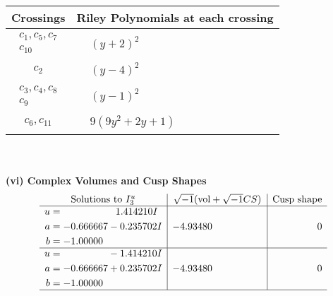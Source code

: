 \documentclass[1p]{elsarticle_modified}
\theoremstyle{definition}
\newcommand{\I}{\sqrt{-1}}
\begin{document}
\begin{tabular}{m{50pt}|m{274pt}}
Crossings & \hspace{64pt}Riley Polynomials at each crossing \\
\hline $$\begin{aligned}c_{1},c_{5},c_{7}\\c_{10}\end{aligned}$$&$\begin{aligned}
&(y+2)^2
\end{aligned}$\\
\hline $$\begin{aligned}c_{2}\end{aligned}$$&$\begin{aligned}
&(y-4)^2
\end{aligned}$\\
\hline $$\begin{aligned}c_{3},c_{4},c_{8}\\c_{9}\end{aligned}$$&$\begin{aligned}
&(y-1)^2
\end{aligned}$\\
\hline $$\begin{aligned}c_{6},c_{11}\end{aligned}$$&$\begin{aligned}
&9(9 y^2+2 y+1)
\end{aligned}$\\
\hline
\end{tabular}\\~\\
\newpage\flushleft \textbf{(vi) Complex Volumes and Cusp Shapes}
$$\begin{array}{c|c|c}  
\text{Solutions to }I^u_{3}& \I (\text{vol} + \sqrt{-1}CS) & \text{Cusp shape}\\
 \hline 
\begin{aligned}
u &= \phantom{-0.000000 -}1.414210 I \\
a &= -0.666667 - 0.235702 I \\
b &= -1.00000\phantom{ +0.000000I}\end{aligned}
 & -4.93480\phantom{ +0.000000I} & \phantom{-0.000000 } 0 \\ \hline\begin{aligned}
u &= \phantom{-0.000000 } -1.414210 I \\
a &= -0.666667 + 0.235702 I \\
b &= -1.00000\phantom{ +0.000000I}\end{aligned}
 & -4.93480\phantom{ +0.000000I} & \phantom{-0.000000 } 0\\
 \hline 
 \end{array}$$\newpage\newpage\renewcommand{\arraystretch}{1}
\end{document}

